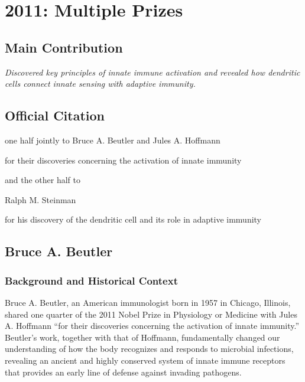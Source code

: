 \chapter[2011 --- Prizes]{2011: Multiple Prizes}
\label{ch:2011_Beutler}

\section*{Main Contribution}

\textit{Discovered key principles of innate immune activation and revealed how dendritic cells connect innate sensing with adaptive immunity.}\cite{nobel-2011,lecture-2011}

\section{Official Citation}

one half jointly to Bruce A. Beutler and Jules A. Hoffmann

for their discoveries concerning the activation of innate immunity

and the other half to

Ralph M. Steinman

for his discovery of the dendritic cell and its role in adaptive immunity

\section{Bruce A. Beutler}

\subsection{Background and Historical Context}

Bruce A. Beutler, an American immunologist born in 1957 in Chicago, Illinois, shared one quarter of the 2011 Nobel Prize in Physiology or Medicine with Jules A. Hoffmann ``for their discoveries concerning the activation of innate immunity.'' Beutler's work, together with that of Hoffmann, fundamentally changed our understanding of how the body recognizes and responds to microbial infections, revealing an ancient and highly conserved system of innate immune receptors that provides an early line of defense against invading pathogens.

